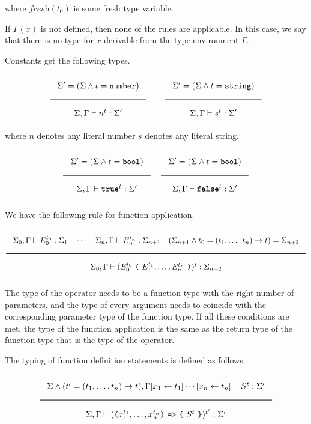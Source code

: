 \noindent
where $\textit{fresh}(t_0)$ is some fresh type variable.

If $\Gamma(x)$ is not defined, then none of the rules are applicable.
In this case, we say that
there is no type for $x$ derivable from the type environment $\Gamma$. 

Constants get the following types.

\noindent
\[
  \Rule{\Sigma' = (\Sigma \wedge t = \Number)}{\Sigma, \Gamma \vdash n^t : \Sigma'}
  \qquad
  \Rule{\Sigma' = (\Sigma \wedge t = \String)}{\Sigma, \Gamma \vdash s^t : \Sigma'}
\]
\noindent
where $n$ denotes any literal number $s$ denotes any literal string.

\noindent
\[
  \Rule{\Sigma' = (\Sigma \wedge t = \Bool)}{\Sigma, \Gamma \vdash \TruE^t : \Sigma'}
  \quad
  \Rule{\Sigma' = (\Sigma \wedge t = \Bool)}{\Sigma, \Gamma \vdash \FalsE^t : \Sigma'}  
\]

We have the following rule for function application.

\[
\Rule{  \Sigma_0, \Gamma \vdash E_0^{t_0} : \Sigma_1 \quad
	\cdots \quad \Sigma_{n}, \Gamma \vdash E_{n}^{t_n} : \Sigma_{n+1} \quad
	(\Sigma_{n+1} \wedge t_0 = (t_1, \ldots, t_n) \rightarrow t) = \Sigma_{n+2}}{
	\Sigma_0, \Gamma \vdash (E_0^{t_0}\ \Lp \ E_1^{t_1}, \ldots, E_n^{t_n}\ \Rp)^t : \Sigma_{n+2}}  
\]

\noindent
The type of the operator needs to be a function type with the right
number of parameters, and the type of every argument needs to coincide
with the corresponding parameter type of the function type. If all these
conditions are met, the type of the function application is the same
as the return type of the function type that is the type of the operator.

The typing of function definition statements is defined as follows.

\noindent
\[
  \Rule{\Sigma \wedge (t' = (t_1, \ldots, t_n) \rightarrow t), \Gamma[x_1 \leftarrow t_1]\cdots
    [x_n \leftarrow t_n]
    \vdash S^{t} : \Sigma'}{
    \Sigma, \Gamma \vdash ( \Lp  x_1^{t_1}, \ldots, x_n^{t_n} \Rp\ \texttt{=>}\ \Lc\ S^{t}\ \Rc)^{t'} : \Sigma'}  
\]




